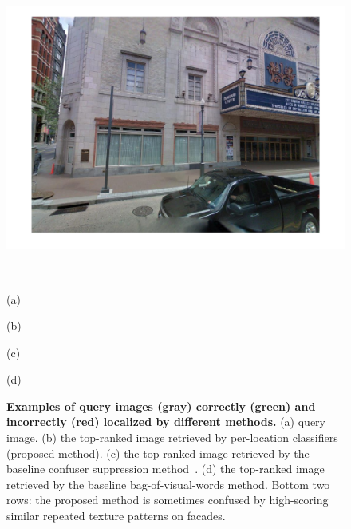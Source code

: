 \begin{figure}[!ht]
{\begin{minipage}{\subw}
{		  }
		\end{minipage}
	 }
	 \colorbox{myGreen}{
		\begin{minipage}{\subw}
		  \centerline{
		  \includegraphics[width=1.05\linewidth]{imgs/aggrv/08aggrvB.jpg}
		  }
		\end{minipage}
	 }
	 \\
	 \begin{minipage}{0.23\linewidth}
		\centering
		(a)
	 \end{minipage}
	 \hspace{3mm}
	 \begin{minipage}{0.23\linewidth}
		\centering
		(b)
	 \end{minipage}
	 \begin{minipage}{0.23\linewidth}
		\centering
		(c)
	 \end{minipage}
	 \begin{minipage}{0.23\linewidth}
		\centering
		(d)
	 \end{minipage}
	 \caption{
		{\bf Examples of query images (gray) correctly (green) and incorrectly (red) localized by different methods.} \;(a) query image. \;(b) the top-ranked image retrieved by per-location classifiers (proposed method). \;(c) the top-ranked image retrieved by the baseline confuser suppression method~\cite{Knopp2010}. \;(d) the top-ranked image retrieved by the baseline bag-of-visual-words method.  Bottom two rows: the proposed method is sometimes confused by high-scoring similar repeated texture patterns on facades.
  	}
	\label{fig:demo1}
 \end{figure}